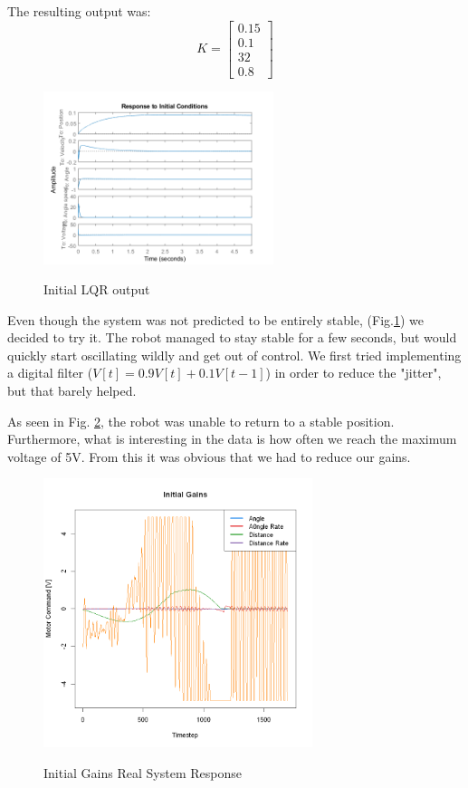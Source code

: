 \documentclass{article}
\begin{document}
The resulting output was:
\[
K = \begin{bmatrix}
    0.15\\
    0.1\\
    32\\
    0.8
\end{bmatrix}    
\]

\begin{figure}[H]
    \caption{Initial LQR output}
    \centering
    \includegraphics[width=0.6\textwidth]{lqrOut_initial.png}
    \label{lqr1}
\end{figure}


Even though the system was not predicted to be entirely stable, (Fig.\ref{lqr1}) we decided to try it. The robot managed to stay stable for a few seconds, but would quickly start oscillating wildly and get out of control. We first tried implementing a digital filter ($V[t] = 0.9V[t] + 0.1V[t-1]$) in order to reduce the "jitter", but that barely helped.

As seen in Fig. \ref{robot_bad}, the robot was unable to return to a stable position. Furthermore, what is interesting in the data is how often we reach the maximum voltage of 5V. From this it was obvious that we had to reduce our gains.

\begin{figure}[H]
    \caption{Initial Gains Real System Response}
    \centering
    \includegraphics[width=0.7\textwidth]{initialGains.png}
    \label{robot_bad}
\end{figure}
\end{document}
